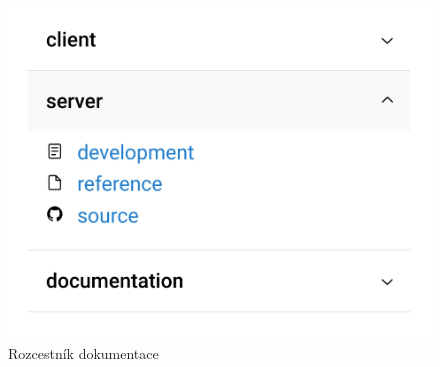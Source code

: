 \begin{figure}
    \centering
    \includegraphics[scale=0.3]{assets/images/docs-accordion}
    \caption{Rozcestník dokumentace}\label{fig:rozcestnik-dokumentace}
\end{figure}
